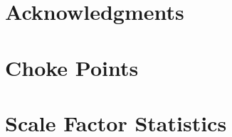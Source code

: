 \documentclass{ldbc}
\begin{document}
\maketitle

\chapter*{Acknowledgments}





















\appendix

\chapter{Choke Points}



\chapter{Scale Factor Statistics}


\end{document}
